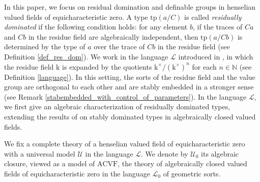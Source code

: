 \documentclass[12pt]{article}
\newcommand{\tpp}{\mathrm{tp}}
\newcommand{\ACVF}{\mathrm{ACVF}}
\newcommand{\0}{\emptyset}
\newcommand{\rf}{\mathrm{k}}
\newcommand{\U}{\mathcal{U}}
\newcommand{\Ualg}{\mathcal{U}_0}
\theoremstyle{plain}%
\theoremstyle{definition}
\theoremstyle{remark}
\begin{document}

In this paper, we focus on residual domination and definable groups in henselian valued fields of equicharacteristic zero. 
A type $\tpp(a/C)$ is called \textit{residually dominated} if the following condition holds: for any element $b$, if the traces of $Ca$ and $Cb$ in the residue field are algebraically independent, then $\tpp(a/Cb)$ is determined by the type of $a$ over the trace of $Cb$ in the residue field (see Definition \ref{def_res_dom}). 
We work in the language $\mathcal{L}$ introduced in \cite{ACG22}, in which the residue field $\rf$ is expanded by the quotients $\rf^{\times}/(\rf^{\times})^n$ for each $n\in \mathbb{N}$ (see Definition \ref{language}). 
In this setting, the sorts of the residue field and the value group are orthogonal to each other and are stably embedded in a stronger sense (see Remark \ref{stabembedded_with_control_of_parameters}). In the language $\mathcal{L}$, we first give an algebraic characterization of residually dominated types, extending the results of \cite{EHS23} on stably dominated types in algebraically closed valued fields.

We fix a complete theory of a henselian valued field of equicharacteristic zero with a universal model $\U$ in the language $\mathcal{L}$. We denote by $\Ualg$ its algebraic closure, viewed as a model of $\ACVF$, the theory of algebraically closed valued fields of equicharacteristic zero in the language $\mathcal{L}_0$ of geometric sorts.
\end{document}
